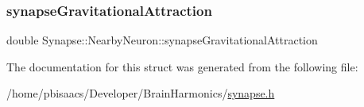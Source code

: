 \mbox{\label{structSynapse_1_1NearbyNeuron_ad81c00ed7d53310fa94f44e1e3fffc77}} 
\subsubsection{\texorpdfstring{synapse\+Gravitational\+Attraction}{synapseGravitationalAttraction}}
{\footnotesize\ttfamily double Synapse\+::\+Nearby\+Neuron\+::synapse\+Gravitational\+Attraction}



The documentation for this struct was generated from the following file\+:\begin{DoxyCompactItemize}
\item 
/home/pbisaacs/\+Developer/\+Brain\+Harmonics/\mbox{\hyperlink{synapse_8h}{synapse.\+h}}\end{DoxyCompactItemize}
